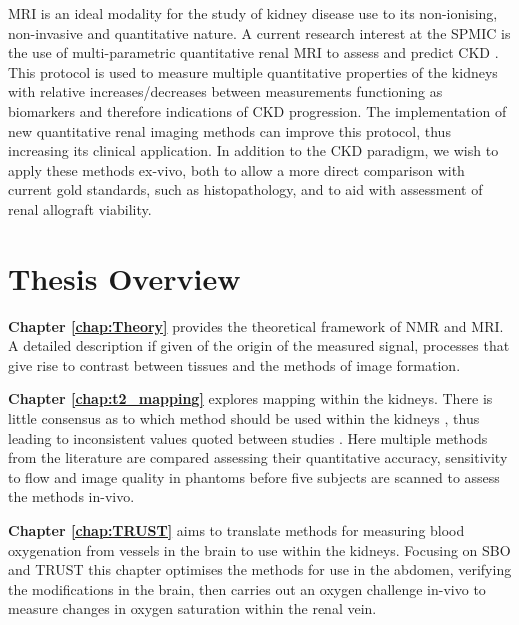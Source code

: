 \ac{MRI} is an ideal modality for the study of kidney disease use to its non-ionising, non-invasive and quantitative nature. A current research interest at the \ac{SPMIC} is the use of multi-parametric quantitative renal \ac{MRI} to assess and predict \ac{CKD} \cite{cox_multiparametric_2017, buchanan_quantitative_2019}. This protocol is used to measure multiple quantitative properties of the kidneys with relative increases/decreases between measurements functioning as biomarkers and therefore indications of \ac{CKD} progression. The implementation of new quantitative renal imaging methods can improve this protocol, thus increasing its clinical application. In addition to the \ac{CKD} paradigm, we wish to apply these methods ex-vivo, both to allow a more direct comparison with current gold standards, such as histopathology, and to aid with assessment of renal allograft viability.

\section{Thesis Overview}
\label{sec:intro_overview}

\textbf{Chapter \ref{chap:Theory}} provides the theoretical framework of \ac{NMR} and \ac{MRI}. A detailed description if given of the origin of the measured signal, processes that give rise to contrast between tissues and the methods of image formation.

\textbf{Chapter \ref{chap:t2_mapping}} explores \ttwo mapping within the kidneys. There is little consensus as to which method should be used within the kidneys \cite{dekkers_consensus-based_2019}, thus leading to inconsistent values quoted between studies \cite{wolf_magnetic_2018}. Here multiple methods from the literature are compared assessing their quantitative accuracy, sensitivity to flow and image quality in phantoms before five subjects are scanned to assess the methods in-vivo.

\textbf{Chapter \ref{chap:TRUST}} aims to translate methods for measuring blood oxygenation from vessels in the brain to use within the kidneys. Focusing on \ac{SBO} \cite{jain_mri_2010} and \ac{TRUST} \cite{lu_quantitative_2008} this chapter optimises the methods for use in the abdomen, verifying the modifications in the brain, then carries out an oxygen challenge in-vivo to measure changes in oxygen saturation within the renal vein.

